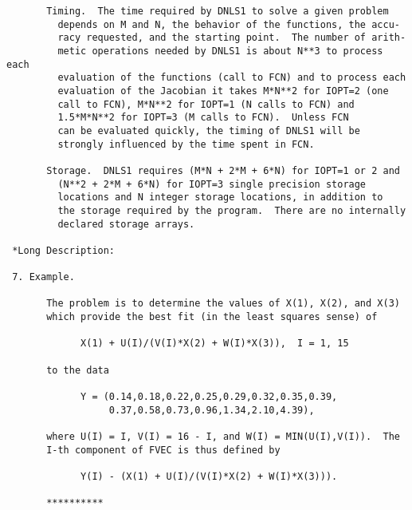 \begin{verbatim}
       Timing.  The time required by DNLS1 to solve a given problem
         depends on M and N, the behavior of the functions, the accu-
         racy requested, and the starting point.  The number of arith-
         metic operations needed by DNLS1 is about N**3 to process each
         evaluation of the functions (call to FCN) and to process each
         evaluation of the Jacobian it takes M*N**2 for IOPT=2 (one
         call to FCN), M*N**2 for IOPT=1 (N calls to FCN) and
         1.5*M*N**2 for IOPT=3 (M calls to FCN).  Unless FCN
         can be evaluated quickly, the timing of DNLS1 will be
         strongly influenced by the time spent in FCN.

       Storage.  DNLS1 requires (M*N + 2*M + 6*N) for IOPT=1 or 2 and
         (N**2 + 2*M + 6*N) for IOPT=3 single precision storage
         locations and N integer storage locations, in addition to
         the storage required by the program.  There are no internally
         declared storage arrays.

 *Long Description:

 7. Example.

       The problem is to determine the values of X(1), X(2), and X(3)
       which provide the best fit (in the least squares sense) of

             X(1) + U(I)/(V(I)*X(2) + W(I)*X(3)),  I = 1, 15

       to the data

             Y = (0.14,0.18,0.22,0.25,0.29,0.32,0.35,0.39,
                  0.37,0.58,0.73,0.96,1.34,2.10,4.39),

       where U(I) = I, V(I) = 16 - I, and W(I) = MIN(U(I),V(I)).  The
       I-th component of FVEC is thus defined by

             Y(I) - (X(1) + U(I)/(V(I)*X(2) + W(I)*X(3))).

       **********


\end{verbatim}
